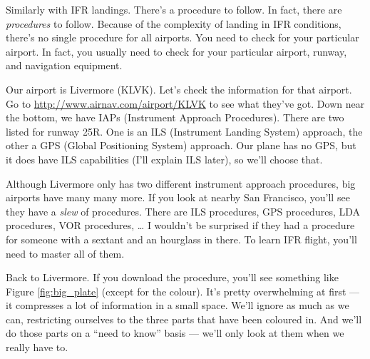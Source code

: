 Similarly with IFR landings.  There's a procedure to follow.  In fact,
there are \emph{procedures} to follow.  Because of the complexity of
landing in IFR conditions, there's no single procedure for all
airports.  You need to check for your particular airport.  In fact,
you usually need to check for your particular airport, runway, and
navigation equipment.

Our airport is Livermore (KLVK).  Let's check the information for that
airport.  Go to \url{http://www.airnav.com/airport/KLVK} to see what
they've got.  Down near the bottom, we have IAPs (Instrument Approach
Procedures).  There are two listed for runway 25R.  One is an ILS
(Instrument Landing System) approach, the other a GPS (Global
Positioning System) approach.  Our plane has no GPS, but it does have
ILS capabilities (I'll explain ILS later), so we'll choose that.

Although Livermore only has two different instrument approach
procedures, big airports have many many more.  If you look at nearby
San Francisco, you'll see they have a \emph{slew} of procedures.
There are ILS procedures, GPS procedures, LDA procedures, VOR
procedures, \ldots{} I wouldn't be surprised if they had a procedure
for someone with a sextant and an hourglass in there.  To learn IFR
flight, you'll need to master all of them.

Back to Livermore.  If you download the procedure, you'll see
something like Figure \ref{fig:big_plate} (except for the colour).
It's pretty overwhelming at first --- it compresses a lot of
information in a small space.  We'll ignore as much as we can,
restricting ourselves to the three parts that have been coloured in.
And we'll do those parts on a ``need to know'' basis --- we'll only
look at them when we really have to.

